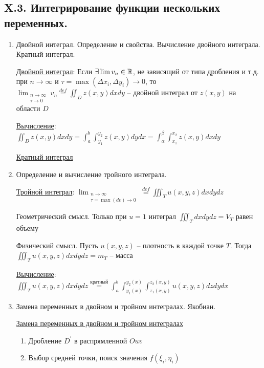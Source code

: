 \documentclass[12pt]{article}
\begin{document}
\begin{enumerate}
    \end{enumerate}

    \subsection{X.3. Интегрирование функции нескольких переменных.}

    \begin{enumerate}
        \item Двойной интеграл. Определение и свойства. Вычисление двойного интеграла. Кратный интеграл.

        \hyperlink{doubleintegral}{Двойной интеграл}: Если $\exists \lim v_n \in \mathbb{R}$, не зависящий от типа дробления и т.д. при $n \rightarrow \infty$ и
        $\tau = \max (\Delta x_i, \Delta y_i) \to 0$, то $\lim_{\substack{n\to\infty \\ \tau \to 0}} v_n \stackrel{def}{=} \iint_D z(x, y) dx dy$ -- двойной интеграл от $z(x, y)$ на области $D$

        \hyperlink{doubleintegralcalculation}{Вычисление}: $\iint_D z(x, y) dxdy = \int_a^b \int_{y_1}^{y_2} z(x, y) dydx = \int_\alpha^\beta \int_{x_1}^{x_2} z(x, y) dxdy$

        \hyperlink{multipleintegral}{Кратный интеграл}

        \item Определение и вычисление тройного интеграла.

        \hyperlink{tripleintegral}{Тройной интеграл}: $\lim_{\substack{n \to \infty \\ \tau = \max (dv) \to 0}} \stackrel{def}{=} \iiint_T u(x, y, z) dxdydz$

        Геометрический смысл. Только при $u = 1$ интеграл $\iiint_T dxdydz = V_T$ равен объему

        Физический смысл. Пусть $u(x, y, z)$ -- плотность в каждой точке $T$. Тогда $\iiint_T u(x, y, z) dxdydz = m_T$ -- масса

        \hyperlink{tripleintegralcalculation}{Вычисление}: $\iiint_T u(x, y, z) dxdydz \stackrel{\text{кратный}}{=} \int^b_a \int_{y_1(x)}^{y_2(x)} \int_{z_1(x, y)}^{z_2(x, y)} u(x, y, z) dz dy dx$


        \item Замена переменных в двойном и тройном интегралах. Якобиан.

        \hyperlink{substitutionindoubleintegral}{Замена переменных в двойном и тройном интегралах}

        \begin{enumerate}
            \item Дробление $D^\prime$ в распрямленной $Ouv$
            \item Выбор средней точки, поиск значения $f(\xi_i, \eta_i)$


\end{enumerate}
\end{enumerate}
\end{document}
